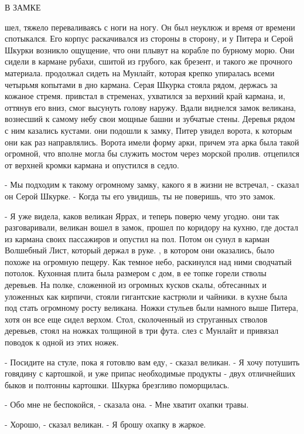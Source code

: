  В ЗАМКЕ
\par{} шел, тяжело переваливаясь с ноги на ногу. Он был неуклюж 
и время от времени спотыкался. Его корпус раскачивался из стороны в 
сторону, и у Питера и Серой Шкурки возникло ощущение, что они плывут 
на корабле по бурному морю. Они сидели в кармане рубахи, сшитой из 
грубого, как брезент, и такого же прочного материала.
 продолжал сидеть на Мунлайт, которая крепко упиралась всеми 
четырьмя копытами в дно кармана. Серая Шкурка стояла рядом, держась за 
кожаное стремя.
 привстал в стременах, ухватился за верхний край кармана, и, 
оттянув его вниз, смог высунуть голову наружу. Вдали виднелся замок 
великана, вознесший к самому небу свои мощные башни и зубчатые стены. 
Деревья рядом с ним казались кустами.
 они подошли к замку, Питер увидел ворота, к которым они как 
раз направлялись. Ворота имели форму арки, причем эта арка была такой 
огромной, что вполне могла бы служить мостом через морской пролив.
 отцепился от верхней кромки кармана и опустился в седло.
\par- Мы подходим к такому огромному замку, какого я в жизни не 
встречал, - сказал он Серой Шкурке. - Когда ты его увидишь, ты не 
поверишь, что это замок.
\par- Я уже видела, каков великан Яррах, и теперь поверю чему угодно.
 они так разговаривали, великан вошел в замок, прошел по 
коридору на кухню, где достал из кармана своих пассажиров и опустил на 
пол. Потом он сунул в карман Волшебный Лист, который держал в руке.
, в котором они оказались, было похоже на огромную 
пещеру. Как темное небо, раскинулся над ними сводчатый потолок. 
Кухонная плита была размером с дом, в ее топке горели стволы деревьев. 
На полке, сложенной из огромных кусков скалы, обтесанных и уложенных 
как кирпичи, стояли гигантские кастрюли и чайники.
 в кухне была под стать огромному росту великана. Ножки 
стульев были намного выше Питера, хотя он все еще сидел верхом. Стол, 
сколоченный из струганных стволов деревьев, стоял на ножках толщиной в 
три фута.
 слез с Мунлайт и привязал поводок к одной из этих ножек.
\par- Посидите на стуле, пока я готовлю вам еду, - сказал великан. - Я 
хочу потушить говядину с картошкой, и уже припас необходимые продукты 
- двух отличнейших быков и полтонны картошки.
 Шкурка брезгливо поморщилась.
\par- Обо мне не беспокойся, - сказала она. - Мне хватит охапки травы.
\par- Хорошо, - сказал великан. - Я брошу охапку в жаркое.
